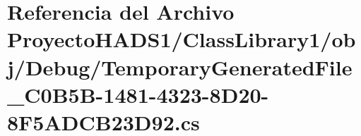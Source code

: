 \hypertarget{_proyecto_h_a_d_s1_2_class_library1_2obj_2_debug_2_temporary_generated_file__036_c0_b5_b-1481-4323-8_d20-8_f5_a_d_c_b23_d92_8cs}{}\section{Referencia del Archivo Proyecto\+H\+A\+D\+S1/\+Class\+Library1/obj/\+Debug/\+Temporary\+Generated\+File\+\_\+C0\+B5\+B-\/1481-\/4323-\/8\+D20-\/8\+F5\+A\+D\+C\+B23\+D92.cs}
\label{_proyecto_h_a_d_s1_2_class_library1_2obj_2_debug_2_temporary_generated_file__036_c0_b5_b-1481-4323-8_d20-8_f5_a_d_c_b23_d92_8cs}
